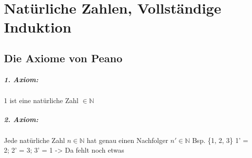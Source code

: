 \chapter{Natürliche Zahlen, Vollständige Induktion}

\section{Die Axiome von Peano}
\paragraph{1. Axiom:}
1 ist eine natürliche Zahl $\in \mathbb{N}$

\paragraph{2. Axiom:}
Jede natürliche Zahl $n \in \mathbb{N}$ hat genau einen Nachfolger $n' \in \mathbb{N}$\newline
Bsp. \{1, 2, 3\} 1' = 2; 2' = 3; 3' = 1 -> Da fehlt noch etwas